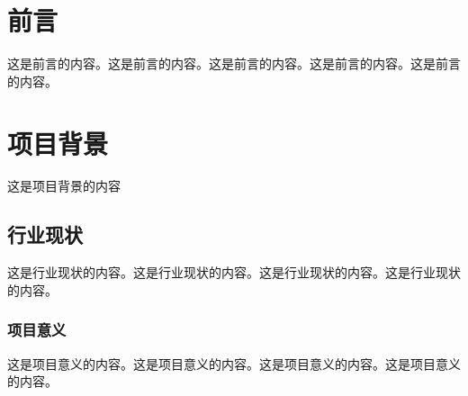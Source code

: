 \chapter{前言}
这是前言的内容。这是前言的内容。这是前言的内容。这是前言的内容。这是前言的内容。
\chapter{项目背景}
这是项目背景的内容
\section{行业现状}
这是行业现状的内容。这是行业现状的内容。这是行业现状的内容。这是行业现状的内容。
\subsection{项目意义}
这是项目意义的内容。这是项目意义的内容。这是项目意义的内容。这是项目意义的内容。